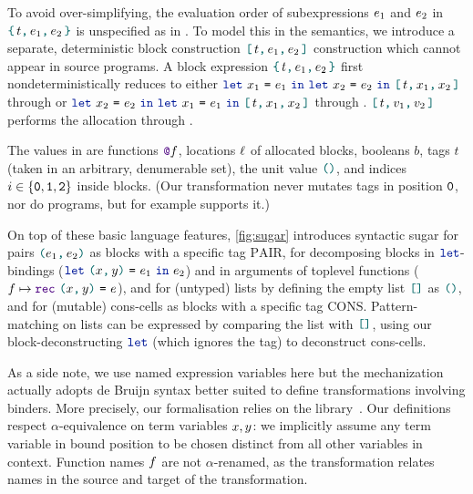 To avoid over-simplifying, the evaluation order of subexpressions $\datalangExpr_1$ and $\datalangExpr_2$ in $\datalangBlock{\datalangTag}{\datalangExpr_1}{\datalangExpr_2}$ is unspecified as in \OCaml.
To model this in the semantics, we introduce a separate, deterministic block construction $\datalangBlockDet{\datalangTag}{\datalangExpr_1}{\datalangExpr_2}$ construction which cannot appear in source programs. A block expression $\datalangBlock{\datalangTag}{\datalangExpr_1}{\datalangExpr_2}$ first nondeterministically reduces to either $\datalangLet{\datalangVar_1}{\datalangExpr_1}{\datalangLet{\datalangVar_2}{\datalangExpr_2}{\datalangBlockDet{\datalangTag}{\datalangVar_1}{\datalangVar_2}}}$ through  or $\datalangLet{\datalangVar_2}{\datalangExpr_2}{\datalangLet{\datalangVar_1}{\datalangExpr_1}{\datalangBlockDet{\datalangTag}{\datalangVar_1}{\datalangVar_2}}}$ through . $\datalangBlockDet{\datalangTag}{\datalangVal_1}{\datalangVal_2}$ performs the allocation through .

The values in \DataLang are functions $\datalangFnptr{\datalangFn}$, locations $\datalangLoc$ of allocated blocks, booleans $b$, tags $t$ (taken in an arbitrary, denumerable set), the unit value $\datalangUnit$, and indices $i \in \{\texttt{0}, \texttt{1}, \texttt{2}\}$ inside blocks. (Our transformation never mutates tags in position $\texttt{0}$, nor do \OCaml programs, but for example \Mezzo supports it.)

On top of these basic language features, \cref{fig:sugar} introduces syntactic sugar for pairs $\datalangPair {\datalangExpr_1} {\datalangExpr_2}$ as blocks with a specific tag $\mathrm{PAIR}$, for decomposing blocks in $\term{\color{datalangKeyword1}{let}}$-bindings ($\datalangLet {\datalangPair \datalangVar \datalangVarTwo} {\datalangExpr_1} {\datalangExpr_2}$) and in arguments of toplevel functions ($\datalangFn \mapsto \datalangRec {\datalangPair \datalangVar \datalangVarTwo} \datalangExpr$), and for (untyped) lists by defining the empty list $\datalangNil$ as $\datalangUnit$, and for (mutable) cons-cells as blocks with a specific tag $\mathrm{CONS}$. Pattern-matching on lists can be expressed by comparing the list with $\datalangNil$, using our block-deconstructing $\term{\color{datalangKeyword1}{let}}$ (which ignores the tag) to deconstruct cons-cells.

As a side note, we use named expression variables here but the \Coq mechanization actually adopts de Bruijn syntax better suited to define transformations involving binders.
More precisely, our formalisation relies on the \Autosubst library~\cite{autosubst-2015}.
Our definitions respect $\alpha$-equivalence on term variables $\datalangVar, \datalangVarTwo$: we implicitly assume any term variable in bound position to be chosen distinct from all other variables in context.
Function names $\datalangFn$ are not $\alpha$-renamed, as the transformation relates names in the source and target of the transformation.

